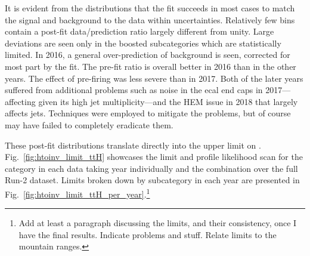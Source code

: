 It is evident from the distributions that the fit succeeds in most cases to match the signal and background to the data within uncertainties. Relatively few bins contain a post-fit data/prediction ratio largely different from unity. Large deviations are seen only in the \ttH boosted subcategories which are statistically limited. In 2016, a general over-prediction of background is seen, corrected for most part by the fit. The pre-fit ratio is overall better in 2016 than in the other years. The effect of pre-firing was less severe than in 2017. Both of the later years suffered from additional problems such as noise in the \acrshort{ecal} end caps in 2017---affecting \ttH given its high jet multiplicity---and the HEM issue in 2018 that largely affects \glspl{jet}. Techniques were employed to mitigate the problems, but of course may have failed to completely eradicate them.

These post-fit distributions translate directly into the upper limit on \BRHinvFull. Fig.~\ref{fig:htoinv_limit_ttH} showcases the limit and profile likelihood scan for the \ttH category in each data taking year individually and the combination over the full Run-2 dataset. Limits broken down by subcategory in each year are presented in Fig.~\ref{fig:htoinv_limit_ttH_per_year}.\footnote{Add at least a paragraph discussing the limits, and their consistency, once I have the final results. Indicate problems and stuff. Relate limits to the mountain ranges.}

